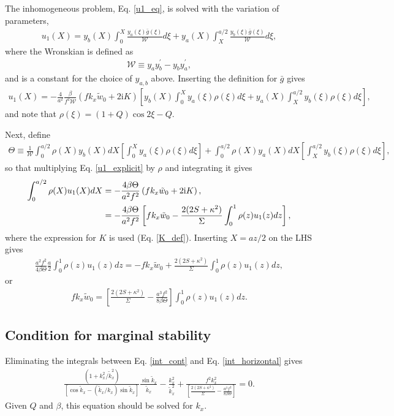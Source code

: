 \documentclass[12pt,preprint]{aastex}
\newcommand{\imgi}{\mathrm{i}}
\begin{document}
The inhomogeneous problem, Eq. \ref{u1_eq}, is solved with the
variation of parameters,
\begin{align}
  u_1(X) =
  y_b(X)\int_0^X\frac{y_a(\xi)\bar{g}(\xi)}{\mathcal{W}}d\xi +
  y_a(X) \int_X^{a/2}\frac{y_b(\xi)\bar{g}(\xi)}{\mathcal{W}}d\xi, 
\end{align} 
where the Wronskian is defined as 
\begin{align}
  \mathcal{W} \equiv y_ay_b^\prime - y_by_a^\prime,
\end{align}
and is a constant for the choice of $y_{a,b}$ above. Inserting the
definition for $\bar{g}$ gives
\begin{align}
  u_1(X) = -\frac{4}{a^2}\frac{\beta}{f^2\mathcal{W}}\left(fk_x\tilde{w}_0 +
  2\imgi K \right)\left[
    y_b(X)\int_0^X y_a(\xi)\rho(\xi) d\xi +
    y_a(X) \int_X^{a/2}y_b(\xi)\rho(\xi)d\xi
    \right],\label{u1_explicit}
\end{align} 
and note that $\rho(\xi) = (1+Q)\cos{2\xi} - Q$. 

Next, define
\begin{align}
\Theta \equiv \frac{1}{\mathcal{W}}\int_0^{a/2}\rho(X)y_b(X)dX\left[\int_0^X y_a(\xi)\rho(\xi) d\xi\right] +
    \int_0^{a/2}\rho(X)y_a(X)dX
    \left[\int_X^{a/2}y_b(\xi)\rho(\xi)d\xi\right], 
\end{align}
so that multiplying Eq. \ref{u1_explicit} by $\rho$ and integrating it
gives 
\begin{align}
\int_0^{a/2}\rho(X)u_1(X)dX &= -\frac{4\beta\Theta}{a^2 f^2
  }\left(fk_x\tilde{w}_0 + 2\imgi K\right),\notag\\
&= -\frac{4\beta\Theta}{a^2 f^2
}\left[fk_x\tilde{w}_0 - \frac{2(2S +
    \kappa^2)}{\Sigma}\int_0^{1}\rho(z)u_1(z)dz\right], 
\end{align}
where the expression for $K$ is used (Eq. \ref{K_def}). Inserting $X = az/2$ on the LHS gives
\begin{align}
  \frac{a^2f^2}{4\beta\Theta}\frac{a}{2}\int_0^1\rho(z)u_1(z)dz = -
  fk_x\tilde{w}_0 +
  \frac{2(2S+\kappa^2)}{\Sigma}\int_0^1\rho(z)u_1(z)dz, 
\end{align}
or
\begin{align}
  fk_x\tilde{w}_0 = \left[\frac{2(2S + \kappa^2)}{\Sigma} -
    \frac{a^3f^2}{8\beta\Theta}\right]\int_0^1\rho(z)u_1(z)dz. \label{int_horizontal}
\end{align}

\subsection{Condition for marginal stability}
Eliminating the integrals between Eq. \ref{int_cont} and
Eq. \ref{int_horizontal} gives
\begin{align}
   \frac{\left(1 +
    k_x^2/\tilde{k}_x^2\right)}{\left[\cos{\tilde{k}_x} -
    \left(\tilde{k}_x/k_x\right)\sin{\tilde{k}_x}\right]}\frac{\sin{\tilde{k}_x}}{\tilde{k}_x} -
  \frac{k_x^2}{\tilde{k}_x^2} + \frac{f^2k_x^2
    }{\left[\frac{2(2S + \kappa^2)}{\Sigma} -
    \frac{a^3f^2}{8\beta\Theta}\right]} = 0.
\end{align}
Given $Q$ and $\beta$, this equation should be solved for $k_x$. 
\end{document}
